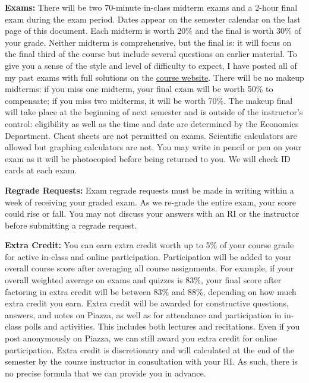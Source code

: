 \documentclass[11pt, letterpaper]{article}
\begin{document}
\medskip

\noindent \textbf{Exams:} 
There will be two 70-minute in-class midterm exams and a 2-hour final exam during the exam period.
Dates appear on the semester calendar on the last page of this document. 
Each midterm is worth 20\% and the final is worth 30\% of your grade.
Neither midterm is comprehensive, but the final is: it will focus on the final third of the course but include several questions on earlier material.
To give you a sense of the style and level of difficulty to expect, I have posted all of my past exams with full solutions on the \href{http://ditraglia.com/Econ103Public}{course website}.
There will be no makeup midterms: if you miss one midterm, your final exam will be worth 50\% to compensate; if you miss two midterms, it will be worth 70\%.
The makeup final will take place at the beginning of next semester and is outside of the instructor's control: eligibility as well as the time and date are determined by the Economics Department. 
Cheat sheets are not permitted on exams.
Scientific calculators are allowed but graphing calculators are not. 
You may write in pencil or pen on your exam as it will be photocopied before being returned to you.
We will check ID cards at each exam.

\medskip

\noindent \textbf{Regrade Requests:}
Exam regrade requests must be made in writing within a week of receiving your graded exam. 
As we re-grade the entire exam, your score could rise or fall. 
You may not discuss your answers with an RI or the instructor before submitting a regrade request. 


\medskip

\noindent \textbf{Extra Credit:} 
You can earn extra credit worth up to 5\% of your course grade for active in-class and online participation. 
Participation will be added to your overall course score after averaging all course assignments.
For example, if your overall weighted average on exams and quizzes is 83\%, your final score after factoring in extra credit will be between 83\% and 88\%, depending on how much extra credit you earn. 
Extra credit will be awarded for constructive questions, answers, and notes on Piazza, as well as for attendance and participation in in-class polls and activities.
This includes both lectures and recitations.
Even if you post anonymously on Piazza, we can still award you extra credit for online participation.
Extra credit is discretionary and will calculated at the end of the semester by the course instructor in consultation with your RI.
As such, there is no precise formula that we can provide you in advance.
\end{document}
